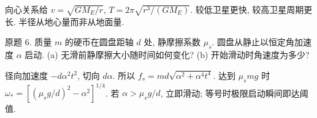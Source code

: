 \begin{solution}
向心关系给 $v=\sqrt{GM_E/r}$, $T=2\pi\sqrt{r^3/(GM_E)}$. 较低卫星更快, 较高卫星周期更长. 半径从地心量而非从地面量.
\end{solution}
\begin{exercise}
原题 6. 质量 $m$ 的硬币在圆盘距轴 $d$ 处, 静摩擦系数 $\mu_s$. 圆盘从静止以恒定角加速度 $\alpha$ 启动. (a) 无滑前静摩擦大小随时间如何变化? (b) 开始滑动时角速度为多少?
\end{exercise}
\begin{solution}
径向加速度 $-d\alpha^2t^2$, 切向 $d\alpha$. 所以 $f_s=md\sqrt{\alpha^2+\alpha^4t^4}$. 达到 $\mu_smg$ 时 $\omega_*=[(\mu_sg/d)^2-\alpha^2]^{1/4}$. 若 $\alpha>\mu_sg/d$, 立即滑动; 等号时极限启动瞬间即达阈值.
\end{solution}
